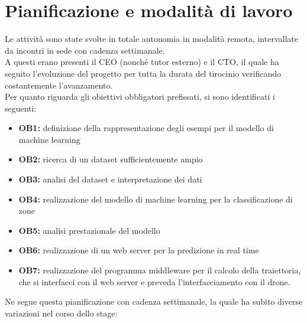 \section{Pianificazione e modalità di lavoro}
\label{sec:pianificazione}
Le attività sono state svolte in totale autonomia in modalità remota, intervallate da incontri in sede con cadenza settimanale.\\
A questi erano presenti il CEO (nonché tutor esterno) e il CTO, il quale ha seguito l'evoluzione del progetto per tutta la durata del tirocinio verificando
costantemente l'avanzamento.\\
Per quanto riguarda gli obiettivi obbligatori prefissati, si sono identificati i seguenti:
\begin{itemize}
		\item \textbf{OB1:} definizione della rappresentazione degli esempi per il modello di machine learning
		\item \textbf{OB2:} ricerca di un dataset sufficientemente ampio
		\item \textbf{OB3:} analisi del dataset e interpretazione dei dati
		\item \textbf{OB4:} realizzazione del modello di machine learning per la classificazione di zone
		\item \textbf{OB5:} analisi prestazionale del modello
		\item \textbf{OB6:} realizzazione di un web server per la predizione in real time
		\item \textbf{OB7:} realizzazione del programma middleware per il calcolo della traiettoria, che si interfacci con il web server e preveda l'interfacciamento con il drone.
\end{itemize}
Ne segue questa pianificazione con cadenza settimanale, la quale ha subito diverse variazioni nel corso dello stage:

